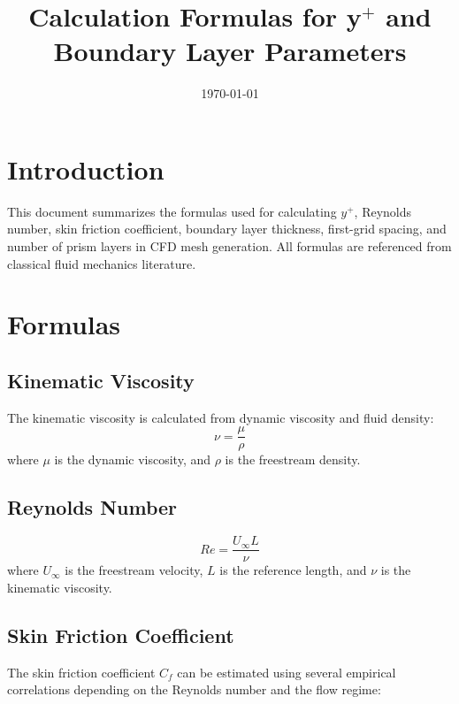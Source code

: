 \documentclass[12pt,a4paper]{article}
\title{Calculation Formulas for y$^+$ and Boundary Layer Parameters}
\date{\today}
\begin{document}
\maketitle

\section{Introduction}
This document summarizes the formulas used for calculating $y^+$, Reynolds number, skin friction coefficient, boundary layer thickness, first-grid spacing, and number of prism layers in CFD mesh generation. All formulas are referenced from classical fluid mechanics literature.

\section{Formulas}

\subsection{Kinematic Viscosity}
The kinematic viscosity is calculated from dynamic viscosity and fluid density:
\begin{equation}
\nu = \frac{\mu}{\rho}
\end{equation}
where $\mu$ is the dynamic viscosity, and $\rho$ is the freestream density.

\subsection{Reynolds Number}
\begin{equation}
Re = \frac{U_\infty L}{\nu}
\end{equation}
where $U_\infty$ is the freestream velocity, $L$ is the reference length, and $\nu$ is the kinematic viscosity.

\subsection{Skin Friction Coefficient}

The skin friction coefficient $C_f$ can be estimated using several empirical correlations depending on the Reynolds number and the flow regime:
\end{document}
